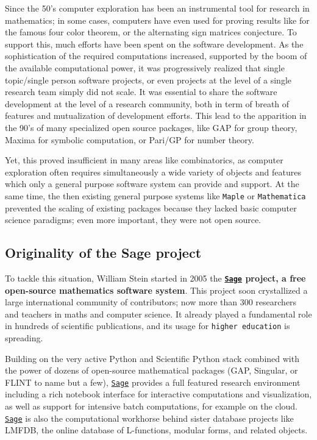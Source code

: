 \documentclass[a4,12pt]{amsart}
\newcommand{\sage}{\href{http://www.sagemath.org/}{\texttt{Sage}}\xspace}
\newcommand{\TODO}[2][To do: ]{{\textcolor{red}{\textbf{#1#2}}}}
\begin{document}
Since the 50's computer exploration has been an instrumental tool for
research in mathematics; in some cases, computers have even used for
proving results like for the famous four color theorem, or the
alternating sign matrices conjecture.
To support this, much efforts have been spent on the software
development. As the sophistication of the required computations
increased, supported by the boom of the available computational power,
it was progressively realized that single topic/single person software
projects, or even projects at the level of a single research team
simply did not scale. It was essential to share the software
development at the level of a research community, both in term of
breath of features and mutualization of development efforts. This lead
to the apparition in the 90's of many specialized open source
packages, like GAP for group theory, Maxima for symbolic computation, or
Pari/GP for number theory.

Yet, this proved insufficient in many areas like combinatorics, as
computer exploration often requires simultaneously a wide variety of
objects and features which only a general purpose software system can
provide and support. At the same time, the then existing general
purpose systems like \texttt{Maple} or \texttt{Mathematica} prevented
the scaling of existing packages because they lacked basic computer
science paradigms; even more important, they were not open source.

\subsection*{Originality of the Sage project}

To tackle this situation, William Stein started in 2005 the \textbf{\sage
project, a free open-source mathematics software system}. This project
soon crystallized a large international community of contributors; now
more than 300 researchers and teachers in maths and computer
science. It already played a fundamental role in hundreds of
scientific publications, and its usage for \texttt{higher education}
is spreading.

Building on the very active Python and Scientific Python stack
combined with the power of dozens of open-source mathematical packages
(GAP, Singular, or FLINT to name but a few), \sage provides a full
featured research environment including a rich notebook interface for
interactive computations and visualization, as well as support for
intensive batch computations, for example on the cloud. \sage is also
the computational workhorse behind sister database projects like
\textsc{LMFDB}, the online database of L-functions, modular forms, and
related objects.
\end{document}
